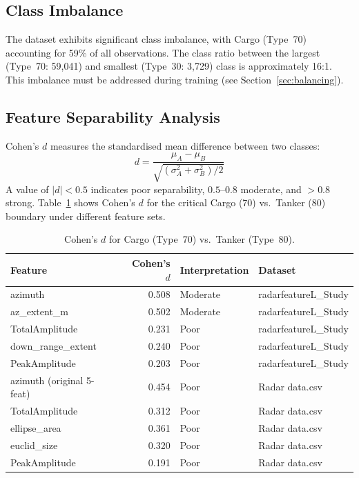 \documentclass[12pt, a4paper]{article}
\begin{document}
\subsection{Class Imbalance}

The dataset exhibits significant class imbalance, with Cargo (Type~70) accounting
for 59\% of all observations. The class ratio between the largest (Type~70:
59,041) and smallest (Type~30: 3,729) class is approximately 16:1.
This imbalance must be addressed during training (see Section~\ref{sec:balancing}).

\subsection{Feature Separability Analysis}
\label{sec:separability}

Cohen's $d$ measures the standardised mean difference between two classes:
\begin{equation}
    d = \frac{\mu_A - \mu_B}{\sqrt{(\sigma_A^2 + \sigma_B^2)/2}}
\end{equation}
A value of $|d| < 0.5$ indicates poor separability, $0.5$--$0.8$ moderate,
and $>0.8$ strong. Table~\ref{tab:cohen} shows Cohen's $d$ for the critical
Cargo (70) vs.\ Tanker (80) boundary under different feature sets.

\begin{table}[H]
\centering
\caption{Cohen's $d$ for Cargo (Type~70) vs.\ Tanker (Type~80).}
\label{tab:cohen}
\begin{tabular}{lrll}
\toprule
\textbf{Feature} & \textbf{Cohen's $d$} & \textbf{Interpretation} & \textbf{Dataset} \\
\midrule
azimuth             & 0.508 & Moderate & radarfeatureL\_Study \\
az\_extent\_m       & 0.502 & Moderate & radarfeatureL\_Study \\
TotalAmplitude      & 0.231 & Poor     & radarfeatureL\_Study \\
down\_range\_extent & 0.240 & Poor     & radarfeatureL\_Study \\
PeakAmplitude       & 0.203 & Poor     & radarfeatureL\_Study \\
\midrule
azimuth (original 5-feat) & 0.454 & Poor & Radar data.csv \\
TotalAmplitude            & 0.312 & Poor & Radar data.csv \\
ellipse\_area             & 0.361 & Poor & Radar data.csv \\
euclid\_size              & 0.320 & Poor & Radar data.csv \\
PeakAmplitude             & 0.191 & Poor & Radar data.csv \\
\bottomrule
\end{tabular}
\end{table}
\end{document}
